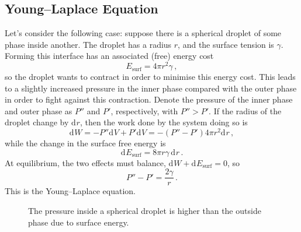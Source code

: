 \documentclass{article}
\theoremstyle{plain}\theoremheaderfont{\normalfont\itshape}\theorembodyfont{\rmfamily}\theoremseparator{.}\newtheorem*{rem}{Remark}\newtheorem*{ex}{Example}\newtheorem*{proof}{Proof}\newtheorem*{altp}{Alternative proof}
\theoremstyle{plain}\theoremheaderfont{\normalfont\bfseries}\theorembodyfont{\rmfamily}\theoremseparator{.}\newtheorem{thm}{Theorem}[section]\newtheorem{lem}[thm]{Lemma}\newtheorem{prop}[thm]{Proposition}\newtheorem*{cor}{Corollary}\newtheorem{defn}[thm]{Definition}\newtheorem{clm}[thm]{Claim}\newtheorem{clminproof}{Claim}\newtheorem*{law}{Law}\newtheorem{pos}[thm]{Postulate}
\theoremstyle{break}\theoremheaderfont{\normalfont\itshape}\theorembodyfont{\rmfamily}\theoremseparator{.\medskip}\newtheorem*{proofskip}{Proof}\newtheorem*{exs}{Examples}\newtheorem*{rems}{Remarks}
\theoremstyle{break}\theoremheaderfont{\normalfont\bfseries}\theorembodyfont{\rmfamily}\theoremseparator{.\medskip}\newtheorem{lemskip}[thm]{Lemma}\newtheorem{defnskip}[thm]{Definition}\newtheorem{propskip}[thm]{Proposition}\newtheorem{thmskip}[thm]{Theorem}
\numberwithin{equation}{section}
\renewcommand{\d}[2][]{\mathrm{d}^{#1} #2}
\begin{document}
	\subsection{Young--Laplace Equation}
	Let's consider the following case: suppose there is a spherical droplet of some phase inside another. The droplet has a radius \(r\), and the surface tension is \(\gamma\). Forming this interface has an associated (free) energy cost
	\begin{equation}
		E_{\text{surf}}=4\pi r^2\gamma\,,
	\end{equation}
	so the droplet wants to contract in order to minimise this energy cost. This leads to a slightly increased pressure in the inner phase compared with the outer phase in order to fight against this contraction. Denote the pressure of the inner phase and outer phase as \(P''\) and \(P'\), respectively, with \(P''>P'\). If the radius of the droplet change by \(\d{r}\), then the work done by the system doing so is
	\begin{equation}
		\d{W}=-P''\d{V}+P'\d{V}=-(P''-P')4\pi r^2\d{r}\,,
	\end{equation}
	while the change in the surface free energy is
	\begin{equation}
		\d{E_{\text{surf}}}=8\pi r\gamma\,\d{r}\,.
	\end{equation}
	At equilibrium, the two effects must balance, \(\d{W}+\d{E_{\text{surf}}}=0\), so
	\begin{equation}
		P''-P'=\frac{2\gamma}{r}\,.
	\end{equation}
	This is the Young--Laplace equation.

	\begin{figure}[ht!]
		\centering
		\caption{The pressure inside a spherical droplet is higher than the outside phase due to surface energy.}
	\end{figure}
\end{document}
